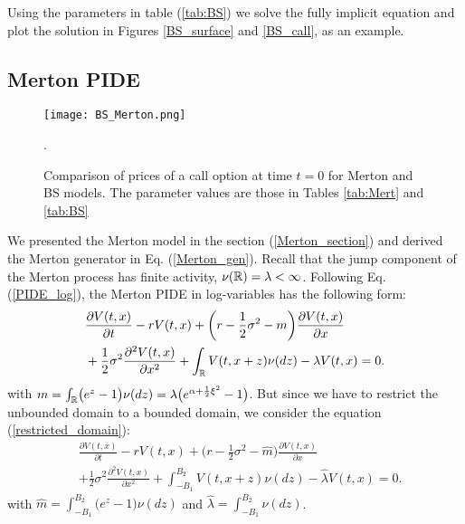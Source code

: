 Using the parameters in table (\ref{tab:BS}) we solve the fully implicit equation and plot the solution in Figures \ref{BS_surface} and \ref{BS_call}, as an example.



\subsection{Merton PIDE}

\begin{figure}[t]
   \centering
   \texttt{[image: BS\_Merton.png]}
   \caption{Comparison of prices of a call option at time $t=0$ for Merton and BS models. The parameter values are those in Tables \ref{tab:Mert} and \ref{tab:BS}}.
   \label{BS_Merton}
\end{figure}  
We presented the Merton model in the section (\ref{Merton_section}) and derived the Merton generator in Eq. (\ref{Merton_gen}). 
Recall that the jump component of the Merton process has finite activity, $\nu(\mathbb{R}) = \lambda < \infty$.
Following Eq. (\ref{PIDE_log}), the Merton PIDE in log-variables has the following form: 
\begin{align}\label{Merton_PIDE}
&  \frac{\partial V(t,x)}{\partial t} - r V(t,x) 
          + \biggl( r -\frac{1}{2}\sigma^2 -m \biggr) \frac{\partial V(t,x)}{\partial x} \\ \nonumber
          &+ \frac{1}{2} \sigma^2 \frac{\partial^2 V(t,x)}{\partial x^2} 
          + \int_{\mathbb{R}} V(t,x+z) \nu(dz) - \lambda V(t,x)  = 0.
\end{align}
with $m = \int_{\mathbb{R}} \bigl( e^z-1 \bigr) \nu(dz) = \lambda \bigl( e^{\alpha + \frac{1}{2} \xi^2} -1 \bigr)$. 
But since we have to restrict the unbounded domain to a bounded domain, we consider the equation (\ref{restricted_domain}):
\begin{align*}
&  \frac{\partial V(t,x)}{\partial t} - r V(t,x) 
          + \biggl( r -\frac{1}{2}\sigma^2 - \hat m \biggr) \frac{\partial V(t,x)}{\partial x} \\
          &+ \frac{1}{2} \sigma^2 \frac{\partial^2 V(t,x)}{\partial x^2} 
          + \int_{-B_1}^{B_2} V(t,x+z) \nu(dz) - \hat \lambda V(t,x)  = 0.
\end{align*}
with $\hat m = \int_{-B_1}^{B_2} \bigl( e^z-1 \bigr) \nu(dz)$ and $\hat \lambda = \int_{-B_1}^{B_2} \nu(dz)$.

